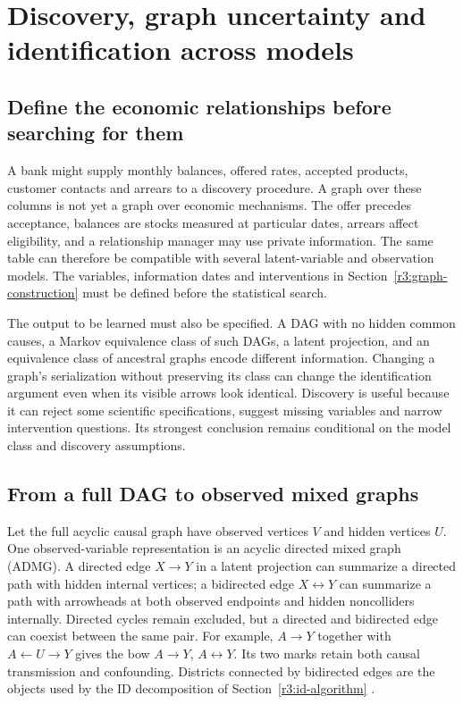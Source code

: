 \chapter{Discovery, graph uncertainty and identification across models}
\label{r3:discovery}
\section{Define the economic relationships before searching for them}
A bank might supply monthly balances, offered rates, accepted products,
customer contacts and arrears to a discovery procedure. A graph over these
columns is not yet a graph over economic mechanisms. The offer precedes
acceptance, balances are stocks measured at particular dates, arrears affect
eligibility, and a relationship manager may use private information. The
same table can therefore be compatible with several latent-variable and
observation models. The variables, information dates and interventions in
Section~\ref{r3:graph-construction} must be defined before the statistical search.

The output to be learned must also be specified. A DAG with no hidden
common causes, a Markov equivalence class of such DAGs, a latent projection,
and an equivalence class of ancestral graphs encode different information.
Changing a graph's serialization without preserving its class can change
the identification argument even when its visible arrows look identical.
Discovery is useful because it can reject some scientific specifications,
suggest missing variables and narrow intervention questions. Its strongest
conclusion remains conditional on the model class and discovery assumptions.

\section{From a full DAG to observed mixed graphs}
\label{r3:latent-graphs}
Let the full acyclic causal graph have observed vertices $V$ and hidden
vertices $U$. One observed-variable representation is an acyclic directed
mixed graph (ADMG). A directed edge $X\to Y$ in a latent projection can
summarize a directed path with hidden internal vertices; a bidirected edge
$X\leftrightarrow Y$ can summarize a path with arrowheads at both
observed endpoints and hidden noncolliders internally. Directed cycles
remain excluded, but a directed and bidirected edge can coexist between
the same pair. For example, $A\to Y$ together with $A\leftarrow U\to Y$
gives the bow $A\to Y$, $A\leftrightarrow Y$. Its two marks retain both
causal transmission and confounding. Districts connected by bidirected
edges are the objects used by the ID decomposition of
Section~\ref{r3:id-algorithm} \citep{id2006}.

